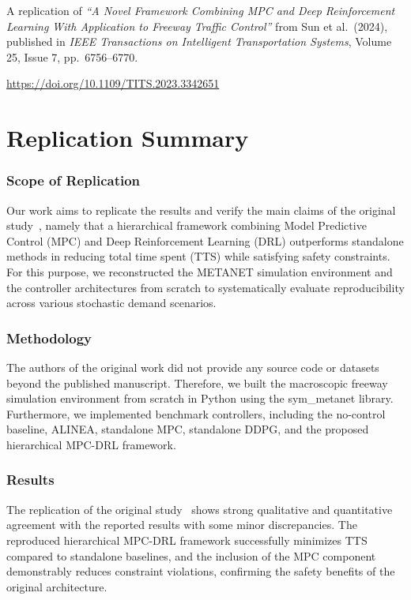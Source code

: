 A replication of \textit{``A Novel Framework Combining MPC and Deep Reinforcement Learning With Application to Freeway Traffic 
Control''} from Sun et al.\ (2024), published in 
\textit{IEEE Transactions on Intelligent Transportation Systems}, Volume 25, Issue 7, pp.~6756--6770.

\href{https://doi.org/10.1109/TITS.2023.3342651}{https://doi.org/10.1109/TITS.2023.3342651} 

\section*{Replication Summary}

\subsubsection{Scope of Replication}

Our work aims to replicate the results and verify the main claims of the original study~\cite{sun2024novel}, namely that a hierarchical framework combining Model Predictive Control (MPC) and Deep Reinforcement Learning (DRL) outperforms standalone methods in reducing total time spent (TTS) while satisfying safety constraints. For this purpose, we reconstructed the METANET simulation environment and the controller architectures from scratch to systematically evaluate reproducibility across various stochastic demand scenarios.

\subsubsection{Methodology}

The authors of the original work did not provide any source code or datasets beyond the published manuscript. Therefore, we built the macroscopic freeway simulation environment from scratch in Python using the sym\_metanet library. Furthermore, we implemented benchmark controllers, including the no-control baseline, ALINEA, standalone MPC, standalone DDPG, and the proposed hierarchical MPC-DRL framework.

\subsubsection{Results}

The replication of the original study~\cite{sun2024novel} shows strong qualitative and quantitative agreement with the reported results with some minor discrepancies. The reproduced hierarchical MPC-DRL framework successfully minimizes TTS compared to standalone baselines, and the inclusion of the MPC component demonstrably reduces constraint violations, confirming the safety benefits of the original architecture.

